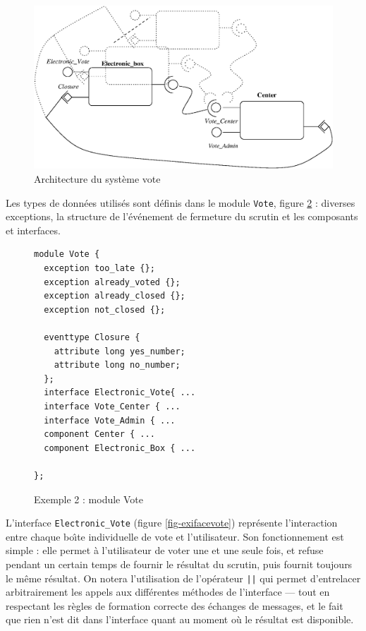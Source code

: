 \begin{figure}[htbp]
    \centering
    \includegraphics[width=.8\textwidth]{figures/exemple_vote.eps}
    \caption{Architecture du syst\`eme vote}
    \label{fig-archivote}
\end{figure}

Les types de donn\'ees utilis\'es sont d\'efinis dans le module
\texttt{Vote}, figure \ref{fig-exvote} : diverses exceptions, la
structure de l'\'ev\'enement de fermeture du scrutin et les
composants et interfaces. 

\begin{figure}[htbp]
    \centering
\begin{lstlisting}
module Vote { 
  exception too_late {};
  exception already_voted {};
  exception already_closed {};
  exception not_closed {};
  
  eventtype Closure {
    attribute long yes_number;
    attribute long no_number;
  };
  interface Electronic_Vote{ ...
  interface Vote_Center { ...
  interface Vote_Admin { ...
  component Center { ...
  component Electronic_Box { ...

};  
\end{lstlisting}
        \caption{Exemple 2 : module Vote}
    \label{fig-exvote}
\end{figure}

L'interface \texttt{Electronic\_Vote} (figure \ref{fig-exifacevote}) repr\'esente l'interaction
entre chaque bo\^{\i}te individuelle de vote et l'utilisateur. Son
fonctionnement est simple : elle permet \`a l'utilisateur de voter
une et une seule fois, et refuse pendant un certain temps de fournir
le r\'esultat du scrutin, puis fournit toujours le m\^eme r\'esultat. On notera l'utilisation
de l'op\'erateur  \verb+||+ qui permet d'entrelacer
arbitrairement les appels aux diff\'erentes m\'ethodes de
l'interface --- tout en respectant les r\`egles de formation correcte
des \'echanges de messages, et le fait que rien n'est dit dans l'interface quant au
moment o\`u le r\'esultat est disponible.

